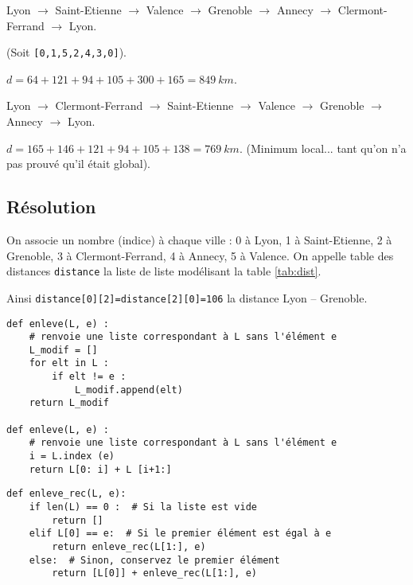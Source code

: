 \ifprof
\begin{corrige}
Lyon
$\rightarrow$ Saint-Etienne  
$\rightarrow$ Valence 
$\rightarrow$ Grenoble 
$\rightarrow$ Annecy
$\rightarrow$ Clermont-Ferrand
$\rightarrow$ Lyon.

(Soit \lstinline{[0,1,5,2,4,3,0]}).

$d = 64  + 121 + 94 + 105 + 300 + 165 = \SI{849}{km}$.



Lyon
$\rightarrow$ Clermont-Ferrand
$\rightarrow$ Saint-Etienne  
$\rightarrow$ Valence 
$\rightarrow$ Grenoble 
$\rightarrow$ Annecy
$\rightarrow$ Lyon.

$d = 165 +  146 + 121 +  94 + 105 + 138 = \SI{769}{km}$. (Minimum local... tant qu'on n'a pas prouvé qu'il était global).


\end{corrige}
\else
\fi

\subsection*{Résolution}

On associe un nombre (indice) à chaque ville : 0 à Lyon, 1 à Saint-Etienne, 2 à Grenoble, 3 à Clermont-Ferrand, 4 à  Annecy, 5 à Valence.
On appelle table des distances \lstinline{distance} la liste de liste modélisant la table \ref{tab:dist}.

Ainsi \lstinline{distance[0][2]=distance[2][0]=106} la distance Lyon -- Grenoble. 

\ifprof
\begin{corrige}
\begin{lstlisting}
def enleve(L, e) :
    # renvoie une liste correspondant à L sans l'élément e
    L_modif = []
    for elt in L :
        if elt != e :
            L_modif.append(elt)
    return L_modif

def enleve(L, e) :
    # renvoie une liste correspondant à L sans l'élément e
    i = L.index (e)
    return L[0: i] + L [i+1:]
\end{lstlisting}
\end{corrige}
\else
\fi


\ifprof
\begin{corrige}
\begin{lstlisting}
def enleve_rec(L, e):
    if len(L) == 0 :  # Si la liste est vide
        return []
    elif L[0] == e:  # Si le premier élément est égal à e
        return enleve_rec(L[1:], e)
    else:  # Sinon, conservez le premier élément
        return [L[0]] + enleve_rec(L[1:], e)
\end{lstlisting}
\end{corrige}
\else
\fi

